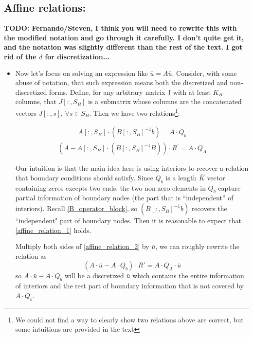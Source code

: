 \documentclass[11pt]{article}
\begin{document}
		\subsection{Affine relations:}
		\textbf{TODO: Fernando/Steven, I think you will need to rewrite this with the modified notation and go through it carefully.  I don't quite get it, and the notation was slightly different than the rest of the text.  I got rid of the $d$ for discretization...}
		\begin{itemize}
			\item Now let's focus on solving an expression like $\bar{u} = A \bar{u}$. Consider, with some abuse of notation, that such expression means both the discretized and non-discretized forms. Define, for any arbitrary matrix J with at least $K_B$ columns, that $J[:,S_B]$ is a submatrix whose columns are the concatenated vectors $J[:,s]$, $\forall s \in S_B$.
			Then we have two relations\footnote{We could not find a way to clearly show two relations above are correct, but some intuitions are provided in the text}:

			\begin{align}
			A [:,S_B] \cdot\left(B[:,S_B]^{-1} b \right) = A \cdot Q_b\label{affine_relation_1}
			\end{align}
			\begin{align}
			(A -A [:,S_B] \cdot(B[:,S_B]^{-1} B))\cdot R^{'} = A \cdot Q_A\label{affine_relation_2}
			\end{align}

			Our intuition is that the main idea here is using interiors to recover a relation that boundary conditions should satisfy. Since $Q_b$ is a length $\bar{K}$ vector containing zeros excepts two ends, the two non-zero elements in $Q_b$ capture partial information of boundary nodes (the part that is ``independent'' of interiors).  Recall \eqref{B_operator_block}, so $\left(B[:,S_B]^{-1} b \right)$ recovers the ``independent" part of boundary nodes. Then it is reasonable to expect that \eqref{affine_relation_1} holds.

			Multiply both sides of \eqref{affine_relation_2} by $\bar{u}$, we can roughly rewrite the relation as
			\begin{equation}
			(A \cdot \bar{u}-A \cdot Q_b) \cdot R' = A \cdot Q_A\cdot \bar{u}
			\end{equation}
			so $A \cdot \bar{u}-A \cdot Q_b$ will be a discretized $\bar{u}$ which contains the entire information of interiors and the rest part of boundary information that is not covered by $A \cdot Q_b$.


\end{itemize}
\end{document}
